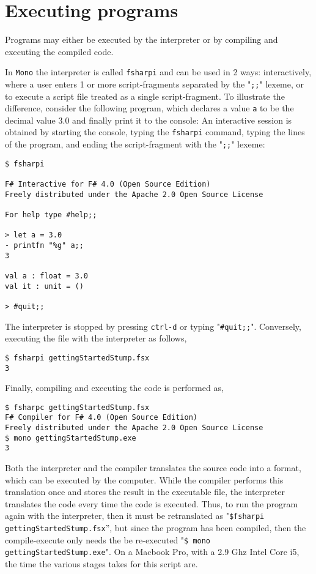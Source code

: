 \section{Executing programs}
Programs may either be executed by the interpreter or by compiling and executing the compiled code. 

In \texttt{Mono} the interpreter is called \texttt{fsharpi} and can be used in 2 ways: interactively, where a user enters 1 or more script-fragments separated by the "\verb|;;|" lexeme, or to execute a script file treated as a single script-fragment. To illustrate the difference, consider the following program, which declares a value \texttt{a} to be the decimal value 3.0 and finally print it to the console:
An interactive session is obtained by starting the console, typing the \texttt{fsharpi} command, typing the lines of the program, and ending the script-fragment with the "\verb|;;|" lexeme:
\begin{lstlisting}[language=console]
$ fsharpi

F# Interactive for F# 4.0 (Open Source Edition)
Freely distributed under the Apache 2.0 Open Source License

For help type #help;;

> let a = 3.0
- printfn "%g" a;;
3

val a : float = 3.0
val it : unit = ()

> #quit;;
\end{lstlisting}
The interpreter is stopped by pressing \texttt{ctrl-d} or typing "\verb|#quit;;|". Conversely, executing the file with the interpreter as follows,
\begin{lstlisting}
$ fsharpi gettingStartedStump.fsx
3
\end{lstlisting}
Finally, compiling and executing the code is performed as,
\begin{lstlisting}
$ fsharpc gettingStartedStump.fsx 
F# Compiler for F# 4.0 (Open Source Edition)
Freely distributed under the Apache 2.0 Open Source License
$ mono gettingStartedStump.exe 
3
\end{lstlisting}
Both the interpreter and the compiler translates the source code into a format, which can be executed by the computer. While the compiler performs this translation once and stores the result in the executable file, the interpreter translates the code every time the code is executed. Thus, to run the program again with the interpreter, then it must be retranslated as "\verb|$fsharpi gettingStartedStump.fsx|'', but since the program has been compiled, then the compile-execute only needs the be re-executed "\verb|$ mono gettingStartedStump.exe|". On a Macbook Pro, with a 2.9 Ghz Intel Core i5, the time the various stages takes for this script are.
